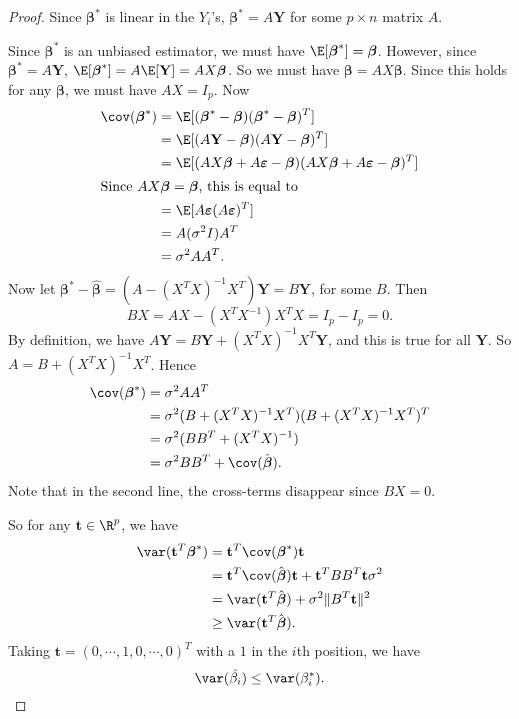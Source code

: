 \documentclass[a4paper]{article}
\begin{document}
\begin{proof}
  Since $\boldsymbol\beta^*$ is linear in the $Y_i$'s, $\boldsymbol\beta^* = A\mathbf{Y}$ for some $p\times n$ matrix $A$.

  Since $\boldsymbol\beta^*$ is an unbiased estimator, we must have $\E[\boldsymbol\beta^*] = \boldsymbol\beta$. However, since $\boldsymbol\beta^* = A\mathbf{Y}$, $\E[\boldsymbol\beta^*] = A\E[\mathbf{Y}] = AX\boldsymbol\beta$. So we must have $\boldsymbol\beta = AX\boldsymbol\beta$. Since this holds for any $\boldsymbol\beta$, we must have $AX = I_p$. Now
  \begin{align*}
    \cov(\boldsymbol\beta^*) &= \E[(\boldsymbol\beta^* - \boldsymbol\beta)(\boldsymbol\beta^* - \boldsymbol\beta)^T]\\
    &= \E[(A\mathbf{Y} - \boldsymbol\beta)(A\mathbf{Y} - \boldsymbol\beta)^T]\\
    &= \E[(AX\boldsymbol\beta + A\boldsymbol\varepsilon - \boldsymbol\beta)(AX\boldsymbol\beta + A\boldsymbol\varepsilon - \boldsymbol\beta)^T]\\
    \intertext{Since $AX\boldsymbol\beta = \boldsymbol\beta$, this is equal to}
    &= \E[A\boldsymbol\varepsilon(A\boldsymbol\varepsilon)^T]\\
    &= A(\sigma^2I)A^T\\
    &= \sigma^2 AA^T.
  \end{align*}
  Now let $\boldsymbol\beta^* - \hat{\boldsymbol\beta} = (A - (X^TX)^{-1}X^T)\mathbf{Y} = B\mathbf{Y}$, for some $B$. Then
  \[
    BX = AX - (X^TX^{-1})X^TX = I_p - I_p = 0.
  \]
  By definition, we have $A\mathbf{Y} = B\mathbf{Y} + (X^TX)^{-1}X^T \mathbf{Y}$, and this is true for all $\mathbf{Y}$. So $A = B + (X^TX)^{-1}X^T$. Hence
  \begin{align*}
    \cov(\boldsymbol\beta^*) &= \sigma^2AA^T\\
    &= \sigma^2(B + (X^TX)^{-1}X^T)(B + (X^TX)^{-1}X^T)^T\\
    &= \sigma^2(BB^T + (X^TX)^{-1})\\
    &= \sigma^2 BB^T + \cov(\hat{\boldsymbol\beta}).
  \end{align*}
  Note that in the second line, the cross-terms disappear since $BX = 0$.

  So for any $\mathbf{t}\in \R^p$, we have
  \begin{align*}
    \var(\mathbf{t}^T\boldsymbol\beta^*) &= \mathbf{t}^T\cov(\boldsymbol\beta^*)\mathbf{t} \\
    &= \mathbf{t}^T\cov (\hat{\boldsymbol\beta})\mathbf{t} + \mathbf{t}^TBB^T\mathbf{t}\sigma^2\\
    &= \var(\mathbf{t}^T \hat{\boldsymbol\beta}) + \sigma^2\|B^T\mathbf{t}\|^2\\
    &\geq \var (\mathbf{t}^T\hat{\boldsymbol\beta}).
  \end{align*}
  Taking $\mathbf{t} = (0, \cdots, 1, 0, \cdots, 0)^T$ with a $1$ in the $i$th position, we have
  \[
    \var(\hat{\beta_i}) \leq \var(\beta_i^*).\qedhere
  \]
\end{proof}
\end{document}
